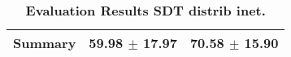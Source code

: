 \begin{table}[htb]
{\begin{tabular}{lll}
\midrule
\textbf{Summary                                  } &                  \phantom{0}59.98 $\pm$ 17.97 &                      \phantom{0}70.58 $\pm$ 15.90 \\
\bottomrule
\end{tabular}%
}
\caption{\textbf{Evaluation Results SDT distrib inet.}}
\label{tab:eval-results}
\end{table}
